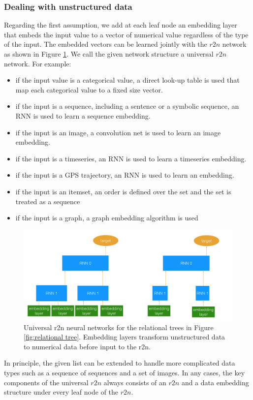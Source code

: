 \subsubsection{Dealing with unstructured data}
Regarding the first assumption, we add at each leaf node an embedding layer that embeds the input value to a vector of numerical value regardless of the type of the input. The embedded vectors can be learned jointly with the $r2n$ network as shown in Figure \ref{fig:universal r2n}. We call the given network structure a universal $r2n$ network. For example:
\begin{itemize}
\item if the input value is a categorical value, a direct look-up table is used that map each categorical value to a fixed size vector. 
\item if the input is a sequence, including a sentence or a symbolic sequence, an RNN is used to learn a sequence embedding.
\item if the input is an image, a convolution net is used to learn an image embedding.
\item if the input is a timeseries, an RNN is used to learn a timeseries embedding.
\item if the input is a GPS trajectory, an RNN is used to learn an embedding. 
\item if the input is an itemset, an order is defined over the set and the set is treated as a sequence 
\item if the input is a graph, a graph embedding algorithm is used 
\end{itemize}
\begin{figure}[tb]
    \centering
    \includegraphics[width=1.0\columnwidth]{./er2n.png}
    \caption{Universal r2n neural networks for the relational trees in Figure \ref{fig:relational tree}. Embedding layers transform unstructured data to numerical data before input to the r2n.}
    \label{fig:universal r2n}
\end{figure}
In principle, the given list can be extended to handle more complicated data types such as a sequence of sequences and a set of images. In any cases, the key components of the universal $r2n$ always consists of an $r2n$ and a data embedding structure under every leaf node of the $r2n$.
